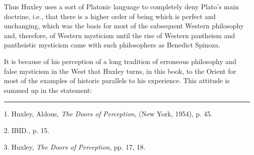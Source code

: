 \hspace*{5mm}Thus Huxley uses a sort of Platonic language to completely
deny Plato's main doctrine, i.e., that there is a higher order
of being which is perfect and unchanging, which was the basis
for most of the subsequent Western philosophy and, therefore,
of Western mysticism until the rise of Western pantheism and
pantheistic mysticism came with such philosophers as Benedict Spinoza.\par
\vspace*{0.5\baselineskip}
It is because of his perception of a long tradition of
erroneous philosophy and false mysticism in the West that
Huxley turns, in this book, to the Orient for most of the
examples of historic parallels to his experience. This attitude
is summed up in the statement:\par
\vspace*{\fill}
\noindent\rule{0.25\textwidth}{0.4pt}\par
1. Huxley, Aldous, \textit{The Doors of Perception}, (New York, 1954), p. 45.\par
2. IBID., p. 15.\par
3. Huxley, \textit{The Doors of Perception}, pp. 17, 18.\par

\newpage

